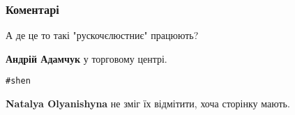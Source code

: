  
 
 
 
 
\subsubsection{Коментарі}

\begin{itemize}
 
А де це то такі "рускочєлюстниє" працюють?

\begin{itemize}
 
\textbf{Андрій Адамчук} у торговому центрі.
\end{itemize}

 
\verb|#shen|

\begin{itemize}
 
\textbf{Natalya Olyanishyna} не зміг їх відмітити, хоча сторінку мають.

 

\end{itemize}
\end{itemize}
